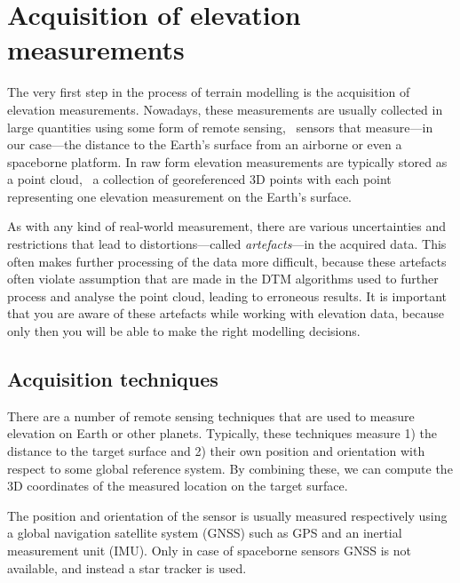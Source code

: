 
\graphicspath{{acquisition/}}

\chapter{Acquisition of elevation measurements}
\label{chap:acquisition}

The very first step in the process of terrain modelling is the acquisition of elevation measurements. 
Nowadays, these measurements are usually collected in large quantities using some form of remote sensing, \ie\ sensors that measure---in our case---the distance to the Earth's surface from an airborne or even a spaceborne platform. 
In raw form elevation measurements are typically stored as a point cloud, \ie\ a collection of georeferenced 3D points with each point representing one elevation measurement on the Earth's surface.

As with any kind of real-world measurement, there are various uncertainties and restrictions that lead to distortions---called \emph{artefacts}---in the acquired data. 
This often makes further processing of the data more difficult, because these artefacts often violate assumption that are made in the DTM algorithms used to further process and analyse the point cloud, leading to erroneous results. 
It is important that you are aware of these artefacts while working with elevation data, because only then you will be able to make the right modelling decisions. 


\section{Acquisition techniques}
\label{sec:acquisistion-techniques}
There are a number of remote sensing techniques that are used to measure elevation on Earth or other planets. 
Typically, these techniques measure 1) the distance to the target surface and 2) their own position and orientation with respect to some global reference system. 
By combining these, we can compute the 3D coordinates of the measured location on the target surface. 

The position and orientation of the sensor is usually measured respectively using a global navigation satellite system (GNSS) such as GPS and an inertial measurement unit (IMU).
Only in case of spaceborne sensors GNSS is not available, and instead a star tracker is used.

